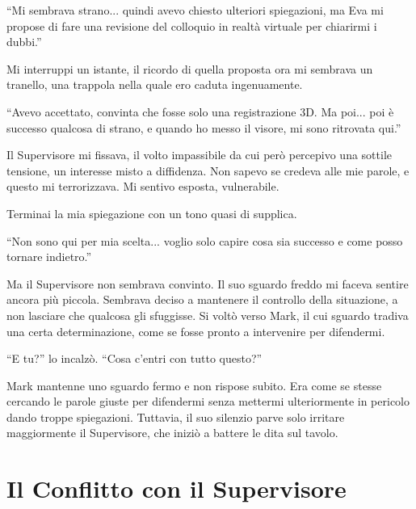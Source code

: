 \begin{dialogue}
 \enquote{Mi sembrava strano... quindi avevo chiesto ulteriori spiegazioni, ma Eva mi propose di fare una revisione del colloquio in realtà virtuale per chiarirmi i dubbi.}
\end{dialogue}

Mi interruppi un istante, il ricordo di quella proposta ora mi sembrava un tranello, una trappola nella quale ero caduta ingenuamente.

\begin{dialogue}
 \enquote{Avevo accettato, convinta che fosse solo una registrazione 3D. Ma poi... poi è successo qualcosa di strano, e quando ho messo il visore, mi sono ritrovata qui.}
\end{dialogue}

Il Supervisore mi fissava, il volto impassibile da cui però percepivo una sottile tensione, un interesse misto a diffidenza. Non sapevo se credeva alle mie parole, e questo mi terrorizzava. Mi sentivo esposta, vulnerabile.

Terminai la mia spiegazione con un tono quasi di supplica.

\begin{dialogue}
 \enquote{Non sono qui per mia scelta... voglio solo capire cosa sia successo e come posso tornare indietro.}
\end{dialogue}

Ma il Supervisore non sembrava convinto. Il suo sguardo freddo mi faceva sentire ancora più piccola. Sembrava deciso a mantenere il controllo della situazione, a non lasciare che qualcosa gli sfuggisse. Si voltò verso Mark, il cui sguardo tradiva una certa determinazione, come se fosse pronto a intervenire per difendermi.

\begin{dialogue}
 \enquote{E tu?} lo incalzò. \enquote{Cosa c'entri con tutto questo?}
\end{dialogue}

Mark mantenne uno sguardo fermo e non rispose subito. Era come se stesse cercando le parole giuste per difendermi senza mettermi ulteriormente in pericolo dando troppe spiegazioni. Tuttavia, il suo silenzio parve solo irritare maggiormente il Supervisore, che iniziò a battere le dita sul tavolo.

\section{Il Conflitto con il Supervisore}


